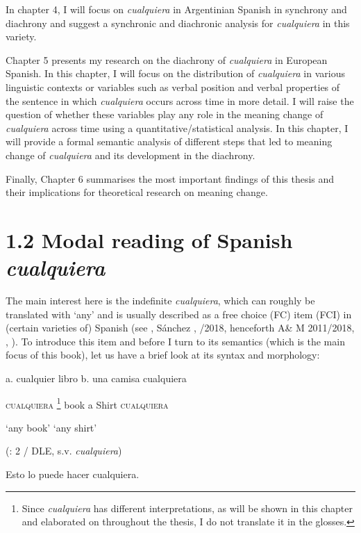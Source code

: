   In chapter 4, I will focus on \textit{cualquiera} in Argentinian Spanish in synchrony and diachrony and suggest a synchronic and diachronic analysis for \textit{cualquiera} in this variety. 

  Chapter 5 presents my research on the diachrony of \textit{cualquiera} in European Spanish. In this chapter, I will focus on the distribution of \textit{cualquiera} in various linguistic contexts or variables such as verbal position and verbal properties of the sentence in which \textit{cualquiera} occurs across time in more detail. I will raise the question of whether these variables play any role in the meaning change of \textit{cualquiera} across time using a quantitative/statistical analysis. In this chapter, I will provide a formal semantic analysis of different steps that led to meaning change of \textit{cualquiera} and its development in the diachrony.

  Finally, Chapter 6 summarises the most important findings of this thesis and their implications for theoretical research on meaning change.

\section{1.2 Modal reading of Spanish \textit{cualquiera}}

The main interest here is the indefinite \textit{cualquiera}, which can roughly be translated with ‘any’ and is usually described as a free choice (FC) item (FCI) in (certain varieties of) Spanish (see \citealt{Brucart1999}, Sánchez \citealt{López1999}, \citealt{Alonso-OvalleMenéndez-Benito2011}/2018, henceforth A\& M 2011/2018, \citealt{Rivero2011}, \citealt{Eberenz2000}). To introduce this item and before I turn to its semantics (which is the main focus of this book), let us have a brief look at its syntax and morphology:

  a.  cualquier  libro  b.  una  camisa  cualquiera

    \textsc{cualquiera}\textstyleFootnoteSymbol{} \footnote{{Since} {\textit{cualquiera}} {has different interpretations, as will be shown in this chapter and elaborated on throughout the thesis, I do not translate it in the glosses.}}  book    a  Shirt   \textsc{cualquiera}

    ‘any book’    ‘any shirt’

         (\citealt{AloniEtAl2011}: 2 / DLE, s.v. \textit{cualquiera})

    Esto  lo  puede  hacer  cualquiera.  

